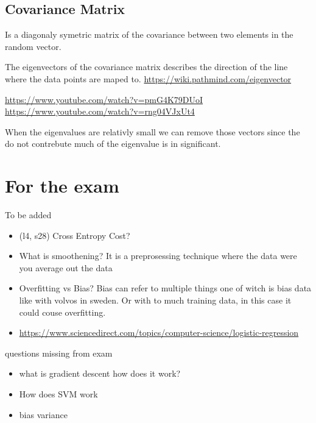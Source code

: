 \subsection{Covariance Matrix}
Is a diagonaly symetric matrix of the covariance between two elements in the random vector.

The eigenvectors of the covariance matrix describes the direction of the line where the
data points are maped to.
\url{https://wiki.pathmind.com/eigenvector}


\url{https://www.youtube.com/watch?v=pmG4K79DUoI}
\url{https://www.youtube.com/watch?v=rng04VJxUt4}

When the eigenvalues are relativly small we can remove those vectors since the do 
not contrebute much of the eigenvalue is in significant.


\section{For the exam}
To be added 
\begin{itemize}
    \item (l4, s28) Cross Entropy Cost?
    \item What is smoothening? It is a preprosessing technique where the data were you average out the data 
    \item Overfitting vs Bias? Bias can refer to multiple things one of witch is bias data like with volvos in sweden. Or with to much training data, in this case it could couse overfitting.
    \item \url{https://www.sciencedirect.com/topics/computer-science/logistic-regression}
\end{itemize}

questions missing from exam 
\begin{itemize}
    \item what is gradient descent how does it work?
    \item How does SVM work 
    \item bias variance
\end{itemize}